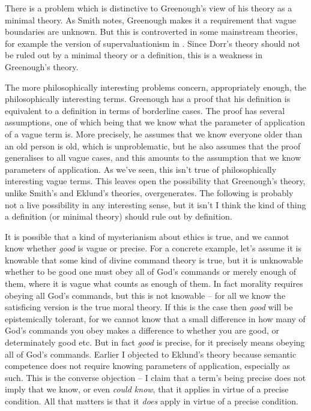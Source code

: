 There is a problem which is distinctive to Greenough's view of his theory as a minimal theory. As Smith notes, Greenough makes it a requirement that vague boundaries are unknown. But this is controverted in some mainstream theories, for example the version of supervaluationism in \citet{Dorr2003}. Since Dorr's theory should not be ruled out by a minimal theory or a definition, this is a weakness in Greenough's theory.

The more philosophically interesting problems concern, appropriately enough, the phil\-osoph\-ic\-ally interesting terms. Greenough has a proof that his definition is equivalent to a definition in terms of borderline cases. The proof has several assumptions, one of which being that we know what the parameter of application of a vague term is. More precisely, he assumes that we know everyone older than an old person is old, which is unproblematic, but he also assumes that the proof generalises to all vague cases, and this amounts to the assumption that we know parameters of application. As we've seen, this isn't true of philosophically interesting vague terms. This leaves open the possibility that Greenough's theory, unlike Smith's and Eklund's theories, overgenerates. The following is probably not a live possibility in any interesting sense, but it isn't I think the kind of thing a definition (or minimal theory) should rule out by definition.

It is possible that a kind of mysterianism about ethics is true, and we cannot know whether \textit{good} is vague or precise. For a concrete example, let's assume it is knowable that some kind of divine command theory is true, but it is unknowable whether to be good one must obey all of God's commands or merely enough of them, where it is vague what counts as enough of them. In fact morality requires obeying all God's commands, but this is not knowable -- for all we know the satisficing version is the true moral theory. If this is the case then \textit{good} will be epistemically tolerant, for we cannot know that a small difference in how many of God's commands you obey makes a difference to whether you are good, or determinately good etc. But in fact \textit{good} is precise, for it precisely means obeying all of God's commands. Earlier I objected to Eklund's theory because semantic competence does not require knowing parameters of application, especially as such. This is the converse objection -- I claim that a term's being precise does not imply that we know, or even \textit{could know}, that it applies in virtue of a precise condition. All that matters is that it \textit{does} apply in virtue of a precise condition.

